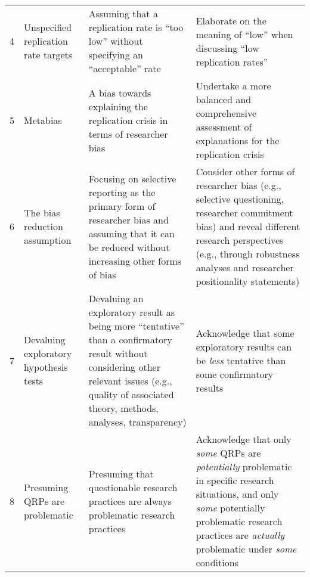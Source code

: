 \documentclass[authordate, meta, issue]{jote-new-article}
\begin{document}
\begin{table*}
\begin{fullwidth}
\begin{tabularx}{\linewidth}{@{} l >{\RaggedRight\arraybackslash}p{12em} >{\RaggedRight\arraybackslash}X >{\RaggedRight\arraybackslash}X@{}}
      4  & Unspecified replication rate targets                                                                                                                                                                                                    & Assuming that a replication rate is “too low” without specifying an “acceptable” rate
         & Elaborate on the meaning of “low” when discussing “low replication rates”
      \\

      5  & Metabias                                                                                                                                                                                                                                & A bias towards explaining the replication crisis in terms of researcher bias
         & Undertake a more balanced and comprehensive assessment of explanations for the replication crisis
      \\

      6  & The bias reduction assumption                                                                                                                                                                                                           & Focusing on selective reporting as the primary form of researcher bias and assuming that it can be reduced without increasing other forms of bias
         & Consider other forms of researcher bias (e.g., selective questioning, researcher commitment bias) and reveal different research perspectives (e.g., through robustness analyses and researcher positionality statements)
      \\

      7  & Devaluing exploratory hypothesis tests                                                                                                                                                                                                  & Devaluing an exploratory result as being more “tentative” than a confirmatory result without considering other relevant issues (e.g., quality of associated theory, methods, analyses, transparency)
         & Acknowledge that some exploratory results can be \emph{less} tentative than some confirmatory results
      \\

      8  & Presuming QRPs are problematic                                                                                                                                                                                                          & Presuming that questionable research practices are always problematic research practices
         & Acknowledge that only \emph{some} QRPs are \emph{potentially} problematic in specific research situations, and only \emph{some} potentially problematic research practices are \emph{actually} problematic under \emph{some} conditions
      \\


\end{tabularx}
\end{fullwidth}
\end{table*}
\end{document}
